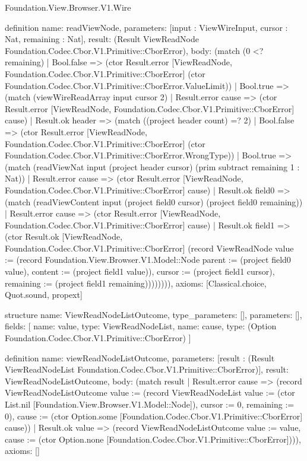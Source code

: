 \begin{lexlean}{Foundation.View.Browser.V1.Wire}
\begin{semanticmodule}
definition{
  name: readViewNode,
  parameters: [input : ViewWireInput, cursor : Nat, remaining : Nat],
  result: (Result ViewReadNode Foundation.Codec.Cbor.V1.Primitive::CborError),
  body: (match (0 <? remaining)
    | Bool.false => (ctor Result.error [ViewReadNode, Foundation.Codec.Cbor.V1.Primitive::CborError] (ctor Foundation.Codec.Cbor.V1.Primitive::CborError.ValueLimit))
    | Bool.true => (match (viewWireReadArray input cursor 2)
      | Result.error cause => (ctor Result.error [ViewReadNode, Foundation.Codec.Cbor.V1.Primitive::CborError] cause)
      | Result.ok header => (match ((project header count) =? 2)
        | Bool.false => (ctor Result.error [ViewReadNode, Foundation.Codec.Cbor.V1.Primitive::CborError] (ctor Foundation.Codec.Cbor.V1.Primitive::CborError.WrongType))
        | Bool.true => (match (readViewNat input (project header cursor) (prim subtract remaining 1 : Nat))
          | Result.error cause => (ctor Result.error [ViewReadNode, Foundation.Codec.Cbor.V1.Primitive::CborError] cause)
          | Result.ok field0 => (match (readViewContent input (project field0 cursor) (project field0 remaining))
            | Result.error cause => (ctor Result.error [ViewReadNode, Foundation.Codec.Cbor.V1.Primitive::CborError] cause)
            | Result.ok field1 => (ctor Result.ok [ViewReadNode, Foundation.Codec.Cbor.V1.Primitive::CborError] (record ViewReadNode {value := (record Foundation.View.Browser.V1.Model::Node {parent := (project field0 value), content := (project field1 value)}), cursor := (project field1 cursor), remaining := (project field1 remaining)}))))))),
  axioms: [Classical.choice, Quot.sound, propext]
}

structure{
  name: ViewReadNodeListOutcome,
  type_parameters: [],
  parameters: [],
  fields: [
    {name: value, type: ViewReadNodeList},
    {name: cause, type: (Option Foundation.Codec.Cbor.V1.Primitive::CborError)}
  ]
}

definition{
  name: viewReadNodeListOutcome,
  parameters: [result : (Result ViewReadNodeList Foundation.Codec.Cbor.V1.Primitive::CborError)],
  result: ViewReadNodeListOutcome,
  body: (match result
    | Result.error cause => (record ViewReadNodeListOutcome {value := (record ViewReadNodeList {value := (ctor List.nil [Foundation.View.Browser.V1.Model::Node]), cursor := 0, remaining := 0}), cause := (ctor Option.some [Foundation.Codec.Cbor.V1.Primitive::CborError] cause)})
    | Result.ok value => (record ViewReadNodeListOutcome {value := value, cause := (ctor Option.none [Foundation.Codec.Cbor.V1.Primitive::CborError])})),
  axioms: []
}


\end{semanticmodule}
\end{lexlean}
